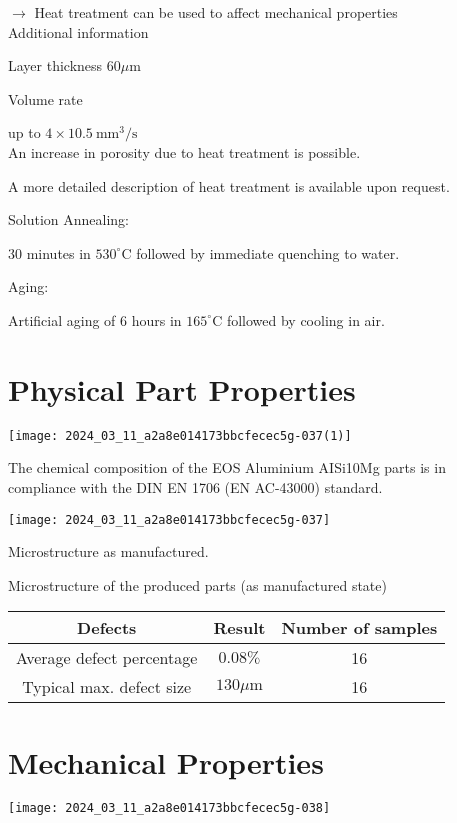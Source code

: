 \documentclass[10pt]{article}
\begin{document}
$\longrightarrow$ Heat treatment can be used to affect mechanical properties\\
Additional information

Layer thickness $60 \mu \mathrm{m}$

Volume rate

up to $4 \times 10.5 \mathrm{~mm}^{3} / \mathrm{s}$\\
An increase in porosity due to heat treatment is possible.

A more detailed description of heat treatment is available upon request.

Solution Annealing:

30 minutes in $530^{\circ} \mathrm{C}$ followed by immediate quenching to water.

Aging:

Artificial aging of 6 hours in $165^{\circ} \mathrm{C}$ followed by cooling in air.

\section*{Physical Part Properties}
\begin{center}
\texttt{[image: 2024\_03\_11\_a2a8e014173bbcfecec5g-037(1)]}
\end{center}

The chemical composition of the EOS Aluminium AISi10Mg parts is in compliance with the DIN EN 1706 (EN AC-43000) standard.

\begin{center}
\texttt{[image: 2024\_03\_11\_a2a8e014173bbcfecec5g-037]}
\end{center}

Microstructure as manufactured.

Microstructure of the produced parts (as manufactured state)

\begin{center}
\begin{tabular}{|c|c|c|}
\hline
Defects & Result & Number of samples \\
\hline
Average defect percentage & $0.08 \%$ & 16 \\
\hline
Typical max. defect size & $130 \mu \mathrm{m}$ & 16 \\
\hline
\end{tabular}
\end{center}

\section*{Mechanical Properties}
\begin{center}
\texttt{[image: 2024\_03\_11\_a2a8e014173bbcfecec5g-038]}
\end{center}
\end{document}

